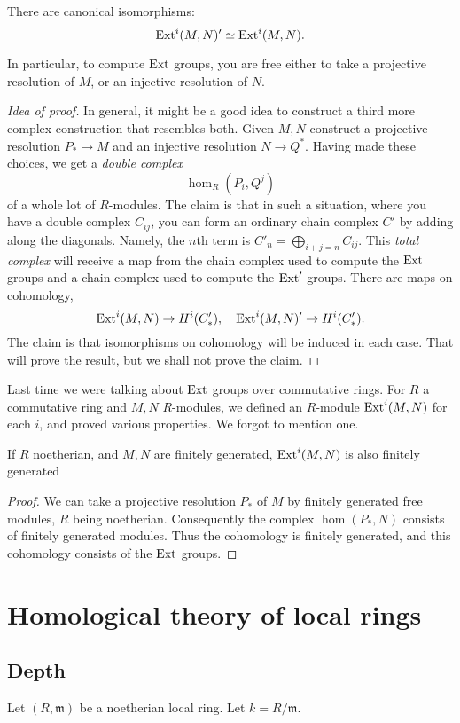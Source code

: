 \begin{theorem}
There are canonical isomorphisms:
\[ \operatorname{Ext}^i(M,N)' \simeq \operatorname{Ext}^i(M,N).  \]
\end{theorem}

In particular, to compute $\operatorname{Ext}$ groups, you are free either to
take a
projective resolution of $M$, or an injective resolution of
$N$.\begin{proof}[Idea of proof]
In general, it might be a good idea to construct a third more
complex
construction that resembles both. Given $M,N$ construct a
projective resolution
$P_* \to M$ and an injective resolution $N \to Q^*$. Having made
these choices,
we get a \emph{double complex}
\[ \hom_R(P_i, Q^j)  \]
of a whole lot of $R$-modules. The claim is that in such a
situation, where
you have a double complex $C_{ij}$, you can
form an ordinary chain complex $C'$
by adding along the diagonals. Namely, the $n$th term
is $C'_n = \bigoplus_{i+j=n} C_{ij}$. This \emph{total complex}
will receive a
map from the chain complex used to compute the $\operatorname{Ext}$ groups
and a chain
complex used to compute the $\operatorname{Ext}'$ groups. There are maps on
cohomology,
\[ \operatorname{Ext}^i(M,N) \to H^i(C'_*), \quad \operatorname{Ext}^i(M,N)' \to H^i(C'_*).
\]
The claim is that isomorphisms on
cohomology will be induced in each case. That will prove the
result, but we
shall not prove the claim.
\end{proof}

Last time we were talking about $\operatorname{Ext}$ groups over commutative
rings. For $R$ a
commutative ring and $M,N$ $R$-modules, we defined an $R$-module
$\operatorname{Ext}^i(M,N)$ for
each $i$, and proved various properties. We forgot to mention
one.

\begin{proposition}
If $R$ noetherian, and $M,N$ are finitely generated,
$\operatorname{Ext}^i(M,N)$ is also finitely generated
\end{proposition}
\begin{proof}
We can take a projective resolution $P_*$ of $M$ by finitely
generated free modules, $R$ being
noetherian. Consequently the complex $\hom(P_*, N)$ consists of
finitely
generated modules. Thus the cohomology is finitely generated,
and this cohomology
consists of the $\operatorname{Ext}$ groups.
\end{proof}

\section{Homological theory of local rings}
\subsection{Depth} Let $(R, \mathfrak{m})$ be  a noetherian
local ring. Let $k = R/\mathfrak{m}$.

